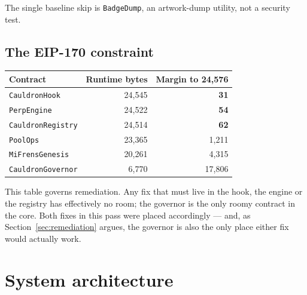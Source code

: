 \documentclass[11pt,a4paper]{article}
\newcommand{\code}[1]{\texttt{\small #1}}
\begin{document}
\noindent The single baseline skip is \code{BadgeDump}, an artwork-dump utility, not a
security test.

\subsection{The EIP-170 constraint}

\begin{longtable}{@{}lrr@{}}
\toprule
\textbf{Contract} & \textbf{Runtime bytes} & \textbf{Margin to 24{,}576} \\
\midrule
\endhead
\code{CauldronHook}      & 24{,}545 & \textbf{31} \\
\code{PerpEngine}        & 24{,}522 & \textbf{54} \\
\code{CauldronRegistry}  & 24{,}514 & \textbf{62} \\
\code{PoolOps}           & 23{,}365 & 1{,}211 \\
\code{MiFrensGenesis}    & 20{,}261 & 4{,}315 \\
\code{CauldronGovernor}  & 6{,}770  & 17{,}806 \\
\bottomrule
\end{longtable}

\noindent This table governs remediation. Any fix that must live in the hook, the engine or
the registry has effectively no room; the governor is the only roomy contract in the core.
Both fixes in this pass were placed accordingly --- and, as Section~\ref{sec:remediation}
argues, the governor is also the only place either fix would actually work.

\section{System architecture}\label{sec:arch}
\end{document}
